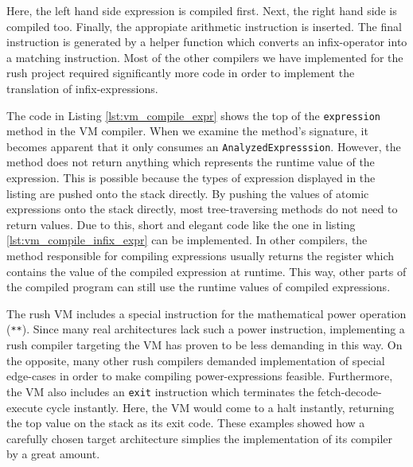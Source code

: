 
Here, the left hand side expression is compiled first.
Next, the right hand side is compiled too.
Finally, the appropiate arithmetic instruction is inserted.
The final instruction is generated by a helper function which converts an infix-operator into a matching instruction.
Most of the other compilers we have implemented for the rush project required significantly more code in order to implement the translation of infix-expressions.


The code in Listing \ref{lst:vm_compile_expr} shows the top of the \texttt{expression} method in the VM compiler.
When we examine the method's signature, it becomes apparent that it only consumes an \texttt{AnalyzedExpresssion}.
However, the method does not return anything which represents the runtime value of the expression.
This is possible because the types of expression displayed in the listing are pushed onto the stack directly.
By pushing the values of atomic expressions onto the stack directly, most tree-traversing methods do not need to return values.
Due to this, short and elegant code like the one in listing \ref{lst:vm_compile_infix_expr} can be implemented.
In other compilers, the method responsible for compiling expressions usually returns the register which contains the value of the compiled expression at runtime.
This way, other parts of the compiled program can still use the runtime values of compiled expressions.

The rush VM includes a special instruction for the mathematical power operation (\texttt{**}).
Since many real architectures lack such a power instruction,
implementing a rush compiler targeting the VM has proven to be less demanding in this way.
On the opposite, many other rush compilers demanded implementation of special edge-cases in order to make compiling power-expressions feasible.
Furthermore, the VM also includes an \texttt{exit} instruction which terminates the fetch-decode-execute cycle instantly.
Here, the VM would come to a halt instantly, returning the top value on the stack as its exit code.
These examples showed how a carefully chosen target architecture simplies the implementation of its compiler by a great amount.

